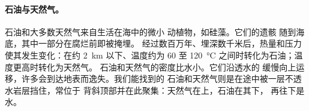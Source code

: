 \paragraph{石油与天然气。} 石油和大多数天然气来自生活在海中的微小
动植物，如硅藻。它们的遗骸
随到海底，其中一部分在腐烂前即被掩埋。
经过数百万年、埋深数千米后，热量和压力
使其发生变化：在约 \qty{2}{km} 以下、温度约为 60 至
\qty{120}{\degreeCelsius} 之间时转化为石油；温度更高时转化为天然气。
石油和天然气的密度比水小。它们沿透水的
缓慢向上运移，许多会到达地表而逸失。我们能找到的
石油和天然气则是在途中被一层不透水岩层挡住，常位于
背斜顶部并在此聚集：天然气在上，石油在其下，
再往下是水。

